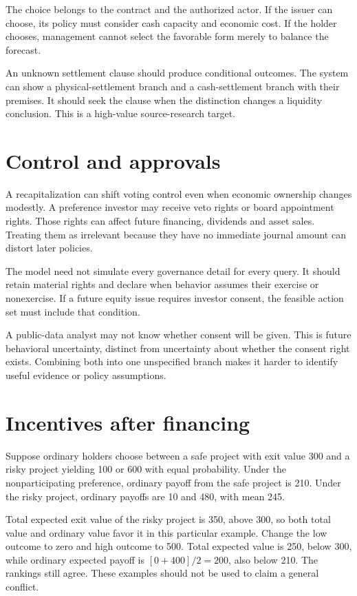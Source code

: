 The choice belongs to the contract and the authorized actor. If the issuer can choose, its policy must consider cash capacity and economic cost. If the holder chooses, management cannot select the favorable form merely to balance the forecast.

An unknown settlement clause should produce conditional outcomes. The system can show a physical-settlement branch and a cash-settlement branch with their premises. It should seek the clause when the distinction changes a liquidity conclusion. This is a high-value source-research target.

\section{Control and approvals}
A recapitalization can shift voting control even when economic ownership changes modestly. A preference investor may receive veto rights or board appointment rights. Those rights can affect future financing, dividends and asset sales. Treating them as irrelevant because they have no immediate journal amount can distort later policies.

The model need not simulate every governance detail for every query. It should retain material rights and declare when behavior assumes their exercise or nonexercise. If a future equity issue requires investor consent, the feasible action set must include that condition.

A public-data analyst may not know whether consent will be given. This is future behavioral uncertainty, distinct from uncertainty about whether the consent right exists. Combining both into one unspecified branch makes it harder to identify useful evidence or policy assumptions.

\section{Incentives after financing}
Suppose ordinary holders choose between a safe project with exit value 300 and a risky project yielding 100 or 600 with equal probability. Under the nonparticipating preference, ordinary payoff from the safe project is 210. Under the risky project, ordinary payoffs are 10 and 480, with mean 245.

Total expected exit value of the risky project is 350, above 300, so both total value and ordinary value favor it in this particular example. Change the low outcome to zero and high outcome to 500. Total expected value is 250, below 300, while ordinary expected payoff is $[0+400]/2=200$, also below 210. The rankings still agree. These examples should not be used to claim a general conflict.

